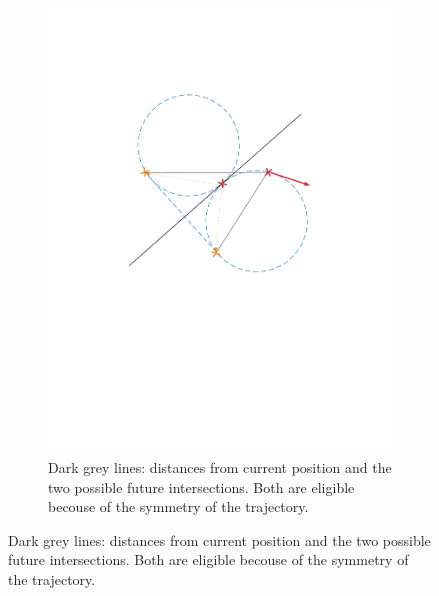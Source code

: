 \begin{itemize}
\begin{figure}[!htbp]
\begin{subfigure}[b]{0.45\textwidth}
        \includegraphics[width=\textwidth]{img/intersection_4.pdf}
        \caption{Dark grey lines: distances from current position and the two possible future intersections. Both are eligible becouse of the symmetry of the trajectory.}
        \label{fig:four}
   \end{subfigure}
   

\end{figure}
\end{itemize}

